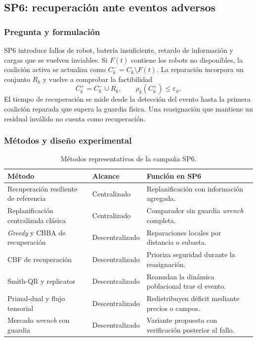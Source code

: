 \subsection{SP6: recuperación ante eventos adversos}
\label{sec:resultados-sp6}

\subsubsection{Pregunta y formulación}

SP6 introduce fallos de robot, batería insuficiente, retardo de información y cargas que se vuelven inviables. Si $F(t)$ contiene los robots no disponibles, la coalición activa se actualiza como $C_k^-=C_k\setminus F(t)$. La reparación incorpora un conjunto $R_k$ y vuelve a comprobar la factibilidad
\[
 C_k^+=C_k^-\cup R_k, \qquad \rho_k(C_k^+)\leq\varepsilon_w.
\]
El tiempo de recuperación se mide desde la detección del evento hasta la primera coalición reparada que supera la guardia física. Una reasignación que mantiene un residual inválido no cuenta como recuperación.



\subsubsection{Métodos y diseño experimental}

\begin{table}[H]
\centering
\scriptsize
\begin{tabularx}{\textwidth}{@{}p{}p{}X@{}}
\toprule
Método & Alcance & Función en SP6 \\
\midrule
Recuperación resiliente de referencia & Centralizado & Replanificación con información agregada. \\
Replanificación centralizada clásica & Centralizado & Comparador sin guardia \emph{wrench} completa. \\
\emph{Greedy} y CBBA de recuperación & Descentralizado & Reparaciones locales por distancia o subasta. \\
CBF de recuperación & Descentralizado & Prioriza seguridad durante la reasignación. \\
Smith-QR y replicator & Descentralizado & Reanudan la dinámica poblacional tras el evento. \\
Primal-dual y flujo tensorial & Descentralizado & Redistribuyen déficit mediante precios o campos. \\
Mercado \emph{wrench} con guardia & Descentralizado & Variante propuesta con verificación posterior al fallo. \\
\bottomrule
\end{tabularx}
\caption{Métodos representativos de la campaña SP6.}
\label{tab:sp6-methods}
\end{table}

